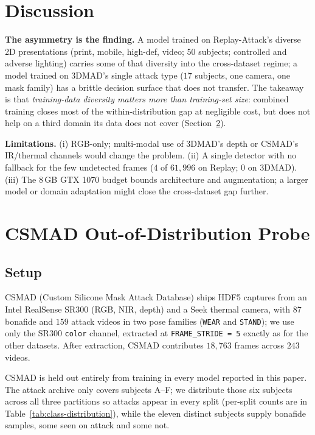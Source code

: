 \documentclass[anonymous, manuscript, screen, review]{acmart}
\begin{document}
\section{Discussion}
\label{sec:discussion}

\textbf{The asymmetry is the finding.} A model trained on
Replay-Attack's diverse 2D presentations (print, mobile, high-def,
video; 50 subjects; controlled and adverse lighting) carries some of
that diversity into the cross-dataset regime; a model trained on
3DMAD's single attack type ($17$ subjects, one camera, one mask family)
has a brittle decision surface that does not transfer. The takeaway is
that \emph{training-data diversity matters more than training-set
size}: combined training closes most of the within-distribution gap at
negligible cost, but does not help on a third domain its data does not
cover (Section~\ref{sec:csmad}).

\textbf{Limitations.} (i) RGB-only; multi-modal use of 3DMAD's depth or
CSMAD's IR/thermal channels would change the problem. (ii) A single
detector with no fallback for the few undetected frames ($4$ of
$61{,}996$ on Replay; $0$ on 3DMAD). (iii) The 8\,GB GTX 1070 budget
bounds architecture and augmentation; a larger model or domain
adaptation might close the cross-dataset gap further.

\section{CSMAD Out-of-Distribution Probe}
\label{sec:csmad}

\subsection{Setup}

CSMAD (Custom Silicone Mask Attack Database) ships HDF5 captures from
an Intel RealSense SR300 (RGB, NIR, depth) and a Seek thermal camera,
with $87$ bonafide and $159$ attack videos in two pose families
(\texttt{WEAR} and \texttt{STAND}); we use only the SR300
\texttt{color} channel, extracted at \texttt{FRAME\_STRIDE = 5}
exactly as for the other datasets. After extraction, CSMAD contributes
$18{,}763$ frames across $243$ videos.

CSMAD is held out entirely from training in every model reported in
this paper. The attack archive only covers subjects A--F; we distribute
those six subjects across all three partitions so attacks appear in
every split (per-split counts are in Table~\ref{tab:class-distribution}),
while the eleven distinct subjects supply bonafide samples, some seen
on attack and some not.
\end{document}
